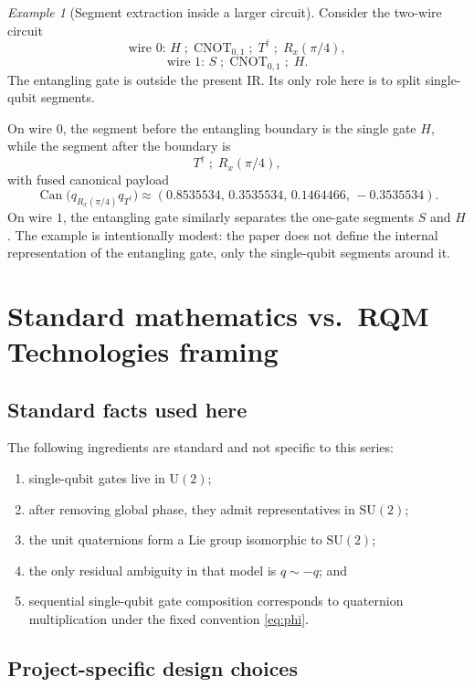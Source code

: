\documentclass[11pt]{article}
\theoremstyle{remark}
\newtheorem{example}[definition]{Example}
\newcommand{\SU}{\mathrm{SU}}
\newcommand{\U}{\mathrm{U}}
\newcommand{\canon}{\operatorname{Can}}
\begin{document}
\begin{example}[Segment extraction inside a larger circuit]
Consider the two-wire circuit
\[
\text{wire 0: } H\;;\;\mathrm{CNOT}_{0,1}\;;\;T^\dagger\;;\;R_x(\pi/4),
\]
\[
\text{wire 1: } S\;;\;\mathrm{CNOT}_{0,1}\;;\;H.
\]
The entangling gate is outside the present IR. Its only role here is to split
single-qubit segments.

On wire $0$, the segment before the entangling boundary is the single gate
$H$, while the segment after the boundary is
\[
T^\dagger\;;\;R_x(\pi/4),
\]
with fused canonical payload
\[
\canon\!\bigl(q_{R_x(\pi/4)} q_{T^\dagger}\bigr)
\approx
(0.8535534,\,0.3535534,\,0.1464466,\,-0.3535534).
\]
On wire $1$, the entangling gate similarly separates the one-gate segments
$S$ and $H$. The example is intentionally modest: the paper does not define the
internal representation of the entangling gate, only the single-qubit segments
around it.
\end{example}

\section{Standard mathematics vs.\ RQM Technologies framing}

\subsection{Standard facts used here}

The following ingredients are standard and not specific to this series:
\begin{enumerate}[label=(\arabic*), leftmargin=1.5em]
\item single-qubit gates live in $\U(2)$;
\item after removing global phase, they admit representatives in $\SU(2)$;
\item the unit quaternions form a Lie group isomorphic to $\SU(2)$;
\item the only residual ambiguity in that model is $q\sim -q$; and
\item sequential single-qubit gate composition corresponds to quaternion
multiplication under the fixed convention \eqref{eq:phi}.
\end{enumerate}

\subsection{Project-specific design choices}
\end{document}
